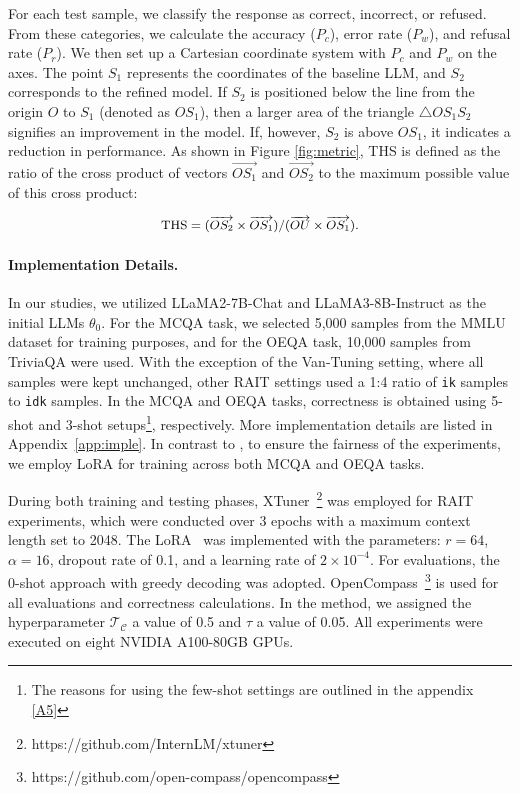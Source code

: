 For each test sample, we classify the response as correct, incorrect, or refused. From these categories, we calculate the accuracy (\(P_c\)), error rate (\(P_w\)), and refusal rate (\(P_r\)). We then set up a Cartesian coordinate system with \(P_c\) and \(P_w\) on the axes. The point \(S_1\) represents the coordinates of the baseline LLM, and \(S_2\) corresponds to the refined model.
If \(S_2\) is positioned below the line from the origin \(O\) to \(S_1\) (denoted as \(OS_1\)), then a larger area of the triangle \(\triangle OS_1S_2\) signifies an improvement in the model. If, however, \(S_2\) is above \(OS_1\), it indicates a reduction in performance. As shown in Figure \ref{fig:metric}, THS is defined as the ratio of the cross product of vectors \(\overrightarrow{OS_1}\) and \(\overrightarrow{OS_2}\) to the maximum possible value of this cross product:


\begin{equation}
\small
\label{eq:loss_decomposition}
\begin{aligned}
\text{THS} = (\overrightarrow{OS_2} \times \overrightarrow{OS_1}) / (\overrightarrow{OU} \times \overrightarrow{OS_1}).
\end{aligned}
\end{equation}



\paragraph{Implementation Details.}

In our studies, we utilized LLaMA2-7B-Chat and LLaMA3-8B-Instruct as the initial LLMs \( \theta_0 \). For the MCQA task, we selected 5,000 samples from the MMLU dataset for training purposes, and for the OEQA task, 10,000 samples from TriviaQA were used. With the exception of the Van-Tuning setting, where all samples were kept unchanged, other RAIT settings used a 1:4 ratio of \texttt{ik} samples to \texttt{idk} samples. In the MCQA and OEQA tasks, correctness is obtained using 5-shot and 3-shot setups\footnote{The reasons for using the few-shot settings are outlined in the appendix \ref{A5}}, respectively. More implementation details are listed in Appendix~\ref{app:imple}. In contrast to \cite{zhu2024utilizeflowsteppingriver}, to ensure the fairness of the experiments, we employ LoRA for training across both MCQA and OEQA tasks.

During both training and testing phases, XTuner~\footnote{https://github.com/InternLM/xtuner} was employed for RAIT experiments, which were conducted over 3 epochs with a maximum context length set to 2048. The LoRA~\cite{hulora} was implemented with the parameters: \(r=64\), \(\alpha=16\), dropout rate of 0.1, and a learning rate of \(2 \times 10^{-4}\). For evaluations, the 0-shot approach with greedy decoding was adopted. OpenCompass~\footnote{https://github.com/open-compass/opencompass} is used for all evaluations and correctness calculations. In the \M method, we assigned the hyperparameter \(\mathcal{T}_{\mathcal{C}}\) a value of 0.5 and \(\tau\) a value of 0.05. All experiments were executed on eight NVIDIA A100-80GB GPUs.




